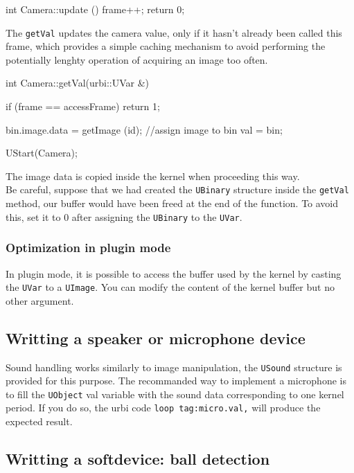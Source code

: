 \begin{urbiscript}
int
Camera::update ()
{
  frame++;
  return 0;
}
\end{urbiscript}

The \lstinline{getVal} updates the camera value, only if it hasn't
already been called this frame, which provides a simple caching
mechanism to avoid performing the potentially lenghty operation of
acquiring an image too often.

\begin{urbiscript}
int
Camera::getVal(urbi::UVar &)
{
  if (frame == accessFrame)
    return 1;

  bin.image.data = getImage (id);
  //assign image to bin
  val = bin;
}

UStart(Camera);
\end{urbiscript}

The image data is copied inside the kernel when proceeding this way.\\

Be careful, suppose that we had created the \lstinline{UBinary}
structure inside the \lstinline{getVal} method, our buffer would have
been freed at the end of the function. To avoid this, set it to 0
after assigning the \lstinline{UBinary} to the \lstinline{UVar}.

\subsubsection{Optimization in plugin mode}

In plugin mode, it is possible to access the buffer used by the kernel
by casting the \lstinline{UVar} to a \lstinline{UImage}. You can modify the content of the
kernel buffer but no other argument.

\subsection{Writting a speaker or microphone device}

Sound handling works similarly to image manipulation, the
\lstinline{USound} structure is provided for this purpose. The
recommanded way to implement a microphone is to fill the
\lstinline{UObject} val variable with the sound data corresponding to
one kernel period. If you do so, the urbi code \lstinline{loop tag:micro.val,}
will produce the expected result.

\subsection{Writting a softdevice: ball detection}

